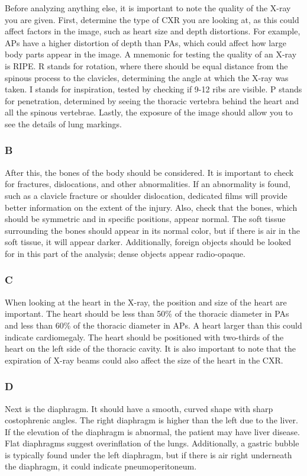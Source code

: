 \documentclass[10pt,twocolumn,letterpaper]{article}
\begin{document}
Before analyzing anything else, it is important to note the quality of the X-ray you are given. First, determine the type of CXR you are looking at, as this could affect factors in the image, such as heart size and depth distortions. For example, APs have a higher distortion of depth than PAs, which could affect how large body parts appear in the image. A mnemonic for testing the quality of an X-ray is RIPE. R stands for rotation, where there should be equal distance from the spinous process to the clavicles, determining the angle at which the X-ray was taken. I stands for inspiration, tested by checking if 9-12 ribs are visible. P stands for penetration, determined by seeing the thoracic vertebra behind the heart and all the spinous vertebrae. Lastly, the exposure of the image should allow you to see the details of lung markings.
\subsubsection{B}
After this, the bones of the body should be considered. It is important to check for fractures, dislocations, and other abnormalities. If an abnormality is found, such as a clavicle fracture or shoulder dislocation, dedicated films will provide better information on the extent of the injury. Also, check that the bones, which should be symmetric and in specific positions, appear normal. The soft tissue surrounding the bones should appear in its normal color, but if there is air in the soft tissue, it will appear darker. Additionally, foreign objects should be looked for in this part of the analysis; dense objects appear radio-opaque.
\subsubsection{C}
When looking at the heart in the X-ray, the position and size of the heart are important. The heart should be less than 50\% of the thoracic diameter in PAs and less than 60\% of the thoracic diameter in APs. A heart larger than this could indicate cardiomegaly. The heart should be positioned with two-thirds of the heart on the left side of the thoracic cavity. It is also important to note that the expiration of X-ray beams could also affect the size of the heart in the CXR.
\subsubsection{D}
Next is the diaphragm. It should have a smooth, curved shape with sharp costophrenic angles. The right diaphragm is higher than the left due to the liver. If the elevation of the diaphragm is abnormal, the patient may have liver disease. Flat diaphragms suggest overinflation of the lungs. Additionally, a gastric bubble is typically found under the left diaphragm, but if there is air right underneath the diaphragm, it could indicate pneumoperitoneum.
\end{document}
